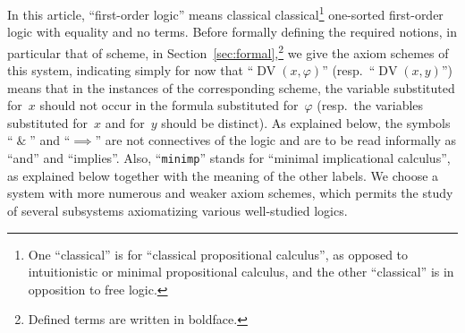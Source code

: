 \documentclass[11pt]{article}
\newcommand*{\andd}{\;\&\;}
\newcommand*{\rimplies}{\implies}
\renewcommand*{\phi}{\varphi}
\DeclareMathOperator{\DV}{DV}
\theoremstyle{plain}
\theoremstyle{definition}
\theoremstyle{remark}
\begin{document}
In this article, ``first-order logic'' means classical classical\footnote{
One ``classical'' is for ``classical propositional calculus'', as opposed to intuitionistic or
minimal propositional calculus, and the other ``classical'' is in opposition to free logic.}
one-sorted first-order logic with equality and no terms.
Before formally defining the required notions, in particular that of scheme, in
Section~\ref{sec:formal},\footnote{
Defined terms are written in boldface.}
we give the axiom schemes of this system, indicating simply for now that ``$\DV(x, \phi)$''
(resp.\ ``$\DV(x, y)$'') means that in the instances of the corresponding scheme, the variable
substituted for~$x$ should not occur in the formula substituted for~$\phi$ (resp.\ the variables
substituted for~$x$ and for~$y$ should be distinct).
As explained below, the symbols ``$\andd$'' and ``$\rimplies$'' are not connectives of the logic
and are to be read informally as ``and'' and ``implies''.
Also, ``\texttt{minimp}'' stands for ``minimal implicational calculus'', as explained below
together with the meaning of the other labels.
We choose a system with more numerous and weaker axiom schemes, which permits the study of
several subsystems axiomatizing various well-studied logics.
\end{document}
